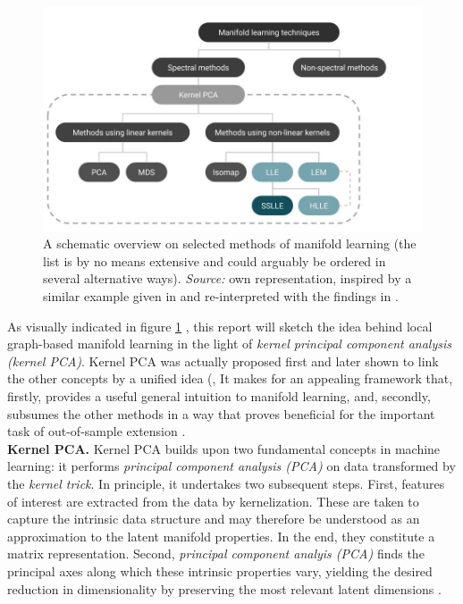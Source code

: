 \begin{figure}[H]
    \centering
    \includegraphics[trim = 0 0 0 0, clip, %
      width = \textwidth]{figures/models-overview}
    \caption[Overview on selected manifold learning models]{A schematic overview 
    on selected methods of manifold learning (the list is by no means extensive 
    and could arguably be ordered in several alternative ways). 
    \textit{Source:} own representation, inspired by a similar example given in 
    \citet{vandermaatenetal2009} and re-interpreted with the findings in 
    \citet{bengioetal2004}.}
    \label{fig:models-overview}
  \end{figure}

As visually indicated in figure \ref{fig:models-overview} , this report will 
sketch the idea behind local graph-based manifold learning in the light of 
\textit{kernel principal component analysis (kernel PCA)}.
Kernel PCA was actually proposed first and later shown to link the other 
concepts by a unified idea (\citet{hametal2003},
It makes for an appealing framework that, firstly, provides a useful general 
intuition to manifold learning, and, secondly, subsumes the other methods in a 
way that proves beneficial for the important task of out-of-sample extension \citep{bengioetal2004}.
\\

\textbf{Kernel PCA.} Kernel PCA builds upon two fundamental concepts 
in machine learning: it performs \textit{principal component analysis (PCA)} on 
data transformed by the \textit{kernel trick}.
In principle, it undertakes two subsequent steps.
First, features of interest are extracted from the data by kernelization. 
These are taken to capture the intrinsic data structure and may therefore be 
understood as an approximation to the latent manifold properties.
In the end, they constitute a matrix representation.
Second, \textit{principal component analyis (PCA)} finds the principal axes 
along which these intrinsic properties vary, yielding the desired reduction in 
dimensionality by preserving the most relevant latent dimensions \citep{schoelkopfetal1998}.

